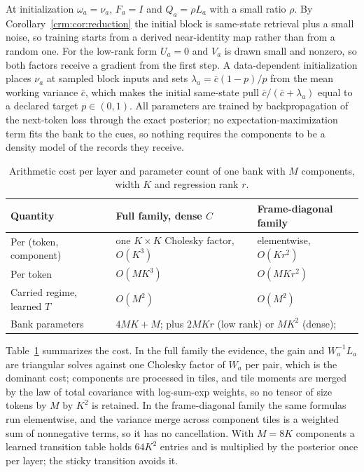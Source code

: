\documentclass[11pt]{article}
\theoremstyle{definition}
\theoremstyle{remark}
\begin{document}
At initialization $\omega_a=\nu_a$, $F_a=I$ and $Q_a=\rho L_a$ with a small ratio $\rho$. By Corollary~\ref{crm:cor:reduction} the initial block is same-state retrieval plus a small noise, so training starts from a derived near-identity map rather than from a random one. For the low-rank form $U_a=0$ and $V_a$ is drawn small and nonzero, so both factors receive a gradient from the first step. A data-dependent initialization places $\nu_a$ at sampled block inputs and sets $\lambda_a=\bar c(1-p)/p$ from the mean working variance $\bar c$, which makes the initial same-state pull $\bar c/(\bar c+\lambda_a)$ equal to a declared target $p\in(0,1)$. All parameters are trained by backpropagation of the next-token loss through the exact posterior; no expectation-maximization term fits the bank to the cues, so nothing requires the components to be a density model of the records they receive.

\begin{table}[t]
\centering
\begin{tabular}{@{}lll@{}}
\toprule
Quantity & Full family, dense $C$ & Frame-diagonal family \\
\midrule
Per (token, component) & one $K\times K$ Cholesky factor, $O(K^3)$ & elementwise, $O(Kr^2)$ \\
Per token & $O(MK^3)$ & $O(MKr^2)$ \\
Carried regime, learned $T$ & $O(M^2)$ & $O(M^2)$ \\
Bank parameters & \multicolumn{2}{l}{$4MK+M$; plus $2MKr$ (low rank) or $MK^2$ (dense);} \
 & \multicolumn{2}{l}{plus $M^2$ (learned $T$)} \\
\bottomrule
\end{tabular}
\caption{Arithmetic cost per layer and parameter count of one bank with $M$ components, width $K$ and regression rank $r$.}
\label{crm:tab:cost}
\end{table}

Table~\ref{crm:tab:cost} summarizes the cost. In the full family the evidence, the gain and $W_a^{-1}L_a$ are triangular solves against one Cholesky factor of $W_a$ per pair, which is the dominant cost; components are processed in tiles, and tile moments are merged by the law of total covariance with log-sum-exp weights, so no tensor of size tokens by $M$ by $K^2$ is retained. In the frame-diagonal family the same formulas run elementwise, and the variance merge across component tiles is a weighted sum of nonnegative terms, so it has no cancellation. With $M=8K$ components a learned transition table holds $64K^2$ entries and is multiplied by the posterior once per layer; the sticky transition avoids it.
\end{document}
